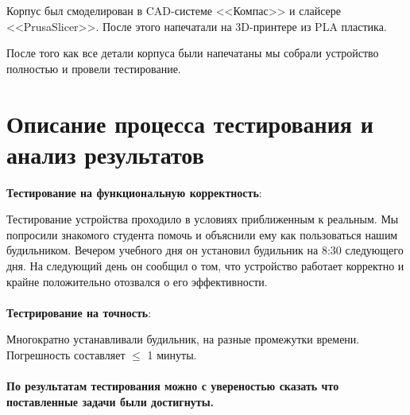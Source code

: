\documentclass[12pt,a4paper]{article}
\begin{document}
Корпус был смоделирован в CAD-системе <<Компас>> и слайсере <<PrusaSlicer>>. После этого напечатали на 3D-принтере из PLA пластика.

После того как все детали корпуса были напечатаны мы собрали устройство полностью и провели тестирование.

\section{Описание процесса тестирования и анализ результатов}

\textbf{Тестирование на функциональную корректность}:

Тестирование устройства проходило в условиях приближенным к реальным. Мы попросили знакомого студента помочь и объяснили ему как пользоваться нашим будильником. Вечером учебного дня он установил будильник на 8:30 следующего дня. На следующий день он сообщил о том, что устройство работает корректно и крайне положительно отозвался о его эффективности.
\\ \\
\textbf{Тестрирование на точность}:

Многократно устанавливали будильник, на разные промежутки времени. Погрешность составляет $\leqslant$ 1 минуты.
\\ \\
\textbf{По результатам тестирования можно с увереностью сказать что поставленные задачи были достигнуты.}
\end{document}
